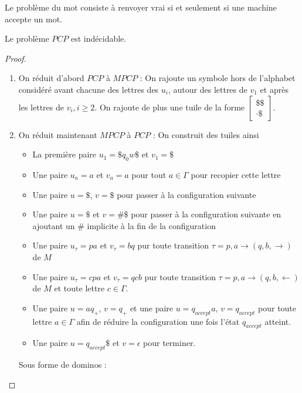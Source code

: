 \documentclass{cours}
\begin{document}
\begin{definition}[$Mot$]
    Le problème du mot consiste à renvoyer vrai si et seulement si une machine accepte un mot.
\end{definition}

\begin{proposition}
    Le problème $PCP$ est indécidable.
\end{proposition}
\begin{proof}
    \begin{enumerate}
        \item On réduit d'abord $PCP$ à $MPCP$ : On rajoute un symbole hors de l'alphabet considéré avant chacune des lettres des $u_{i}$, autour des lettres de $v_{1}$ et après les lettres de $v_{i}, i \geq 2$. On rajoute de plus une tuile de la forme $\left[\begin{array}{c}\$\$ \\ \cdot\$\end{array}\right]$.
        \item On réduit maintenant $MPCP$ à $PCP$ : On construit des tuiles ainsi
        \begin{itemize}
            \item La première paire $u_{1} = \$q_{0}w\$$ et $v_{1} = \$$
            \item Une paire $u_{a} = a$ et $v_{a} = a$ pour tout $a \in \Gamma$ pour recopier cette lettre
            \item Une paire $u = \$$, $v=\$$ pour passer à la configuration suivante
            \item Une paire $u = \$$ et $v = \#\$$ pour passer à la configuration suivante en ajoutant un $\#$ implicite à la fin de la configuration
            \item Une paire $u_{\tau} = pa$ et $v_{\tau} = bq$ pur toute transition $\tau = p, a \rightarrow (q, b, \rightarrow)$ de $M$
            \item Une paire $u_{\tau} = cpa$ et $v_{\tau} = qcb$ pur toute transition $\tau = p, a \rightarrow (q, b, \leftarrow)$ de $M$ et toute lettre $c \in \Gamma$.
            \item Une paire $u = aq_{+}$, $v = q_{+}$ et une paire $u = q_{accept}a$, $v = q_{accept}$ pour toute lettre $a \in \Gamma$ afin de réduire la configuration une fois l'état $q_{accept}$ atteint.
            \item Une paire $u = q_{accept}\$$ et $v = \epsilon$ pour terminer.        
        \end{itemize}
        Sous forme de dominos : 

\end{enumerate}
\end{proof}
\end{document}
